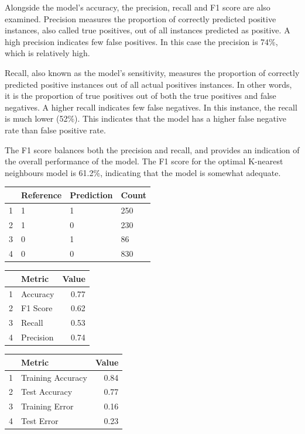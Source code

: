 \documentclass[11pt,preprint, authoryear]{elsarticle}
\let\origtable\table
\let\endorigtable\endtable
\renewenvironment{table}[1][2] {
    \expandafter\origtable\expandafter[H]
} {
    \endorigtable
}
\numberwithin{equation}{section}
\numberwithin{figure}{section}
\numberwithin{table}{section}
\begin{document}
Alongside the model's accuracy, the precision, recall and F1 score are
also examined. Precision measures the proportion of correctly predicted
positive instances, also called true positives, out of all instances
predicted as positive. A high precision indicates few false positives.
In this case the precision is 74\%, which is relatively high.

Recall, also known as the model's sensitivity, measures the proportion
of correctly predicted positive instances out of all actual positives
instances. In other words, it is the proportion of true positives out of
both the true positives and false negatives. A higher recall indicates
few false negatives. In this instance, the recall is much lower (52\%).
This indicates that the model has a higher false negative rate than
false positive rate.

The F1 score balances both the precision and recall, and provides an
indication of the overall performance of the model. The F1 score for the
optimal K-nearest neighbours model is 61.2\%, indicating that the model
is somewhat adequate.

\begin{table}[H]
\centering
\begin{tabular}{rlll}
  \hline
 & Reference & Prediction & Count \\ 
  \hline
1 & 1 & 1 & 250 \\ 
  2 & 1 & 0 & 230 \\ 
  3 & 0 & 1 &  86 \\ 
  4 & 0 & 0 & 830 \\ 
   \hline
\end{tabular}
\caption{Confusion Matrix for KNN Model \label{tab1}} 
\end{table}

\begin{table}[H]
\centering
\begin{tabular}{rlr}
  \hline
 & Metric & Value \\ 
  \hline
1 & Accuracy & 0.77 \\ 
  2 & F1 Score & 0.62 \\ 
  3 & Recall & 0.53 \\ 
  4 & Precision & 0.74 \\ 
   \hline
\end{tabular}
\caption{Metrics for KNN Model \label{tab1}} 
\end{table}

\begin{table}[H]
\centering
\begin{tabular}{rlr}
  \hline
 & Metric & Value \\ 
  \hline
1 & Training Accuracy & 0.84 \\ 
  2 & Test Accuracy & 0.77 \\ 
  3 & Training Error & 0.16 \\ 
  4 & Test Error & 0.23 \\ 
   \hline
\end{tabular}
\caption{More Metrics for KNN Model \label{tab1}} 
\end{table}
\end{document}
